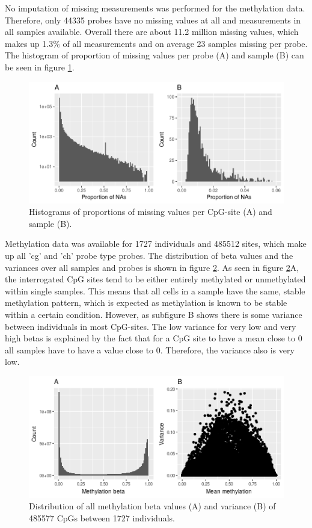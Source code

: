\documentclass[a4paper,12pt,twoside,openright]{article}
\begin{document}
No imputation of missing measurements was performed for the methylation data. Therefore, only 44335 probes have no missing values at all and measurements in all samples available. Overall there are about 11.2 million missing values, which makes up 1.3\% of all measurements and on average 23 samples missing per probe. The histogram of proportion of missing values per probe (A) and sample (B) can be seen in figure \ref{fig:meth.na.hist}.

\begin{figure}[tb]
	\includegraphics[scale = 1, keepaspectratio = true]{../figures/meth_na_hist}  
	\caption{Histograms of proportions of missing values per CpG-site (A) and sample (B).}
    \label{fig:meth.na.hist}
\end{figure}

Methylation data was available for 1727 individuals and 485512 sites, which make up all 'cg' and 'ch' probe type probes. The distribution of beta values and the variances over all samples and probes is shown in figure \ref{fig:meth.raw.hist.var}. As seen in figure \ref{fig:meth.raw.hist.var}A, the interrogated CpG sites tend to be either entirely methylated or unmethylated within single samples. This means that all cells in a sample have the same, stable methylation pattern, which is expected as methylation is known to be stable within a certain condition\cite{}. However, as subfigure B shows there is some variance between individuals in most CpG-sites. The low variance for very low and very high betas is explained by the fact that for a CpG site to have a mean close to 0 all samples have to have a value close to 0. Therefore, the variance also is very low.

 
\begin{figure}[tb]
	\includegraphics[scale = 0.99, keepaspectratio = true]{../figures/meth_raw_hist_var}  
	\caption{Distribution of all methylation beta values (A) and variance (B) of 485577 CpGs between 1727 individuals.}
    \label{fig:meth.raw.hist.var}
\end{figure}
\end{document}
